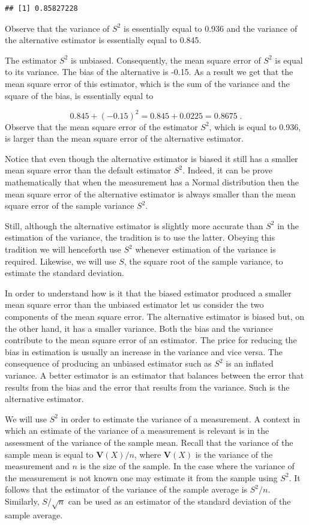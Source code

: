 \documentclass[]{krantz}
\newcommand{\Var}{\mathbf{V}}
\theoremstyle{definition}
\theoremstyle{definition}
\theoremstyle{definition}
\theoremstyle{remark}
\begin{document}
\begin{verbatim}
## [1] 0.85827228
\end{verbatim}

Observe that the variance of \(S^2\) is essentially equal to 0.936 and the
variance of the alternative estimator is essentially equal to 0.845.

The estimator \(S^2\) is unbiased. Consequently, the mean square error of
\(S^2\) is equal to its variance. The bias of the alternative is -0.15. As
a result we get that the mean square error of this estimator, which is
the sum of the variance and the square of the bias, is essentially equal
to

\[0.845 + (-0.15)^2 = 0.845 + 0.0225 = 0.8675\;.\] Observe that the
mean square error of the estimator \(S^2\), which is equal to 0.936, is
larger than the mean square error of the alternative estimator.

Notice that even though the alternative estimator is biased it still has
a smaller mean square error than the default estimator \(S^2\). Indeed, it
can be prove mathematically that when the measurement has a Normal
distribution then the mean square error of the alternative estimator is
always smaller than the mean square error of the sample variance \(S^2\).

Still, although the alternative estimator is slightly more accurate than
\(S^2\) in the estimation of the variance, the tradition is to use the
latter. Obeying this tradition we will henceforth use \(S^2\) whenever
estimation of the variance is required. Likewise, we will use \(S\), the
square root of the sample variance, to estimate the standard deviation.

In order to understand how is it that the biased estimator produced a
smaller mean square error than the unbiased estimator let us consider
the two components of the mean square error. The alternative estimator
is biased but, on the other hand, it has a smaller variance. Both the
bias and the variance contribute to the mean square error of an
estimator. The price for reducing the bias in estimation is usually an
increase in the variance and vice versa. The consequence of producing an
unbiased estimator such as \(S^2\) is an inflated variance. A better
estimator is an estimator that balances between the error that results
from the bias and the error that results from the variance. Such is the
alternative estimator.

We will use \(S^2\) in order to estimate the variance of a measurement. A
context in which an estimate of the variance of a measurement is
relevant is in the assessment of the variance of the sample mean. Recall
that the variance of the sample mean is equal to \(\Var(X)/n\), where
\(\Var(X)\) is the variance of the measurement and \(n\) is the size of the
sample. In the case where the variance of the measurement is not known
one may estimate it from the sample using \(S^2\). It follows that the
estimator of the variance of the sample average is \(S^2/n\). Similarly,
\(S/\sqrt{n}\) can be used as an estimator of the standard deviation of
the sample average.
\end{document}
